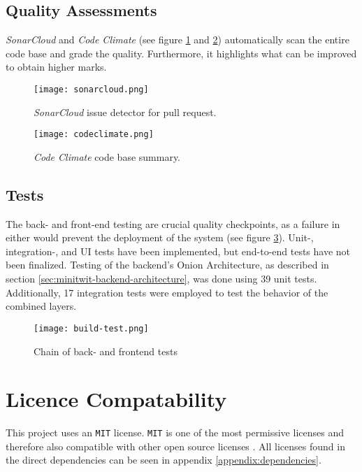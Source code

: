 \subsection{Quality Assessments}

\textit{SonarCloud} and \textit{Code Climate} (see figure \ref{fig:sonarcloud} and \ref{fig:codeclimate}) automatically scan the entire code base and grade the quality. Furthermore, it highlights what can be improved to obtain higher marks.

\begin{figure}[H]
    \centering
    \texttt{[image: sonarcloud.png]}
    \caption{\textit{SonarCloud} issue detector for pull request.}
    \label{fig:sonarcloud}
\end{figure}

\begin{figure}[H]
    \centering
    \texttt{[image: codeclimate.png]}
    \caption{\textit{Code Climate} code base summary.}
    \label{fig:codeclimate}
\end{figure}

\subsection{Tests}

The back- and front-end testing are crucial quality checkpoints, as a failure in either would prevent the deployment of the system (see figure \ref{fig:tests}). Unit-, integration-, and UI tests have been implemented, but end-to-end tests have not been finalized. Testing of the backend's Onion Architecture, as described in section \ref{sec:minitwit-backend-architecture}, was done using 39 unit tests. Additionally, 17 integration tests were employed to test the behavior of the combined layers.

\begin{figure}[H]
    \centering
    \texttt{[image: build-test.png]}
    \caption{Chain of back- and frontend tests}
    \label{fig:tests}
\end{figure}

\section{Licence Compatability}

This project uses an \texttt{MIT} license. \texttt{MIT} is one of the most permissive licenses and therefore also compatible with other open source licenses \cite{wheeler:floss-license-slide}.  All licenses found in the direct dependencies can be seen in appendix \ref{appendix:dependencies}.